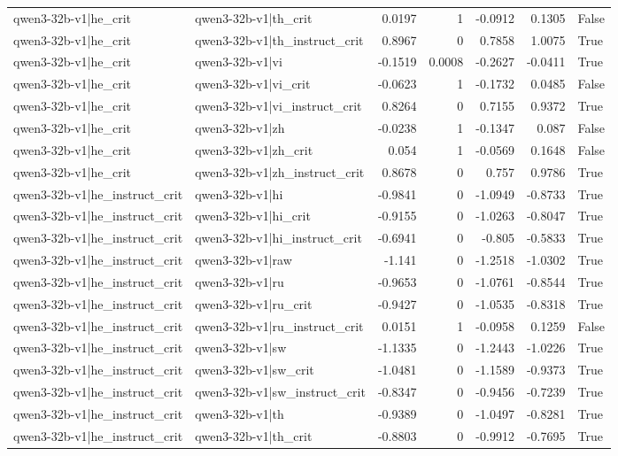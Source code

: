 \begin{table}
\begin{tabular}{l l r r r r l}
qwen3-32b-v1|he_crit & qwen3-32b-v1|th_crit & 0.0197 & 1 & -0.0912 & 0.1305 & False \\
qwen3-32b-v1|he_crit & qwen3-32b-v1|th_instruct_crit & 0.8967 & 0 & 0.7858 & 1.0075 & True \\
qwen3-32b-v1|he_crit & qwen3-32b-v1|vi & -0.1519 & 0.0008 & -0.2627 & -0.0411 & True \\
qwen3-32b-v1|he_crit & qwen3-32b-v1|vi_crit & -0.0623 & 1 & -0.1732 & 0.0485 & False \\
qwen3-32b-v1|he_crit & qwen3-32b-v1|vi_instruct_crit & 0.8264 & 0 & 0.7155 & 0.9372 & True \\
qwen3-32b-v1|he_crit & qwen3-32b-v1|zh & -0.0238 & 1 & -0.1347 & 0.087 & False \\
qwen3-32b-v1|he_crit & qwen3-32b-v1|zh_crit & 0.054 & 1 & -0.0569 & 0.1648 & False \\
qwen3-32b-v1|he_crit & qwen3-32b-v1|zh_instruct_crit & 0.8678 & 0 & 0.757 & 0.9786 & True \\
qwen3-32b-v1|he_instruct_crit & qwen3-32b-v1|hi & -0.9841 & 0 & -1.0949 & -0.8733 & True \\
qwen3-32b-v1|he_instruct_crit & qwen3-32b-v1|hi_crit & -0.9155 & 0 & -1.0263 & -0.8047 & True \\
qwen3-32b-v1|he_instruct_crit & qwen3-32b-v1|hi_instruct_crit & -0.6941 & 0 & -0.805 & -0.5833 & True \\
qwen3-32b-v1|he_instruct_crit & qwen3-32b-v1|raw & -1.141 & 0 & -1.2518 & -1.0302 & True \\
qwen3-32b-v1|he_instruct_crit & qwen3-32b-v1|ru & -0.9653 & 0 & -1.0761 & -0.8544 & True \\
qwen3-32b-v1|he_instruct_crit & qwen3-32b-v1|ru_crit & -0.9427 & 0 & -1.0535 & -0.8318 & True \\
qwen3-32b-v1|he_instruct_crit & qwen3-32b-v1|ru_instruct_crit & 0.0151 & 1 & -0.0958 & 0.1259 & False \\
qwen3-32b-v1|he_instruct_crit & qwen3-32b-v1|sw & -1.1335 & 0 & -1.2443 & -1.0226 & True \\
qwen3-32b-v1|he_instruct_crit & qwen3-32b-v1|sw_crit & -1.0481 & 0 & -1.1589 & -0.9373 & True \\
qwen3-32b-v1|he_instruct_crit & qwen3-32b-v1|sw_instruct_crit & -0.8347 & 0 & -0.9456 & -0.7239 & True \\
qwen3-32b-v1|he_instruct_crit & qwen3-32b-v1|th & -0.9389 & 0 & -1.0497 & -0.8281 & True \\
qwen3-32b-v1|he_instruct_crit & qwen3-32b-v1|th_crit & -0.8803 & 0 & -0.9912 & -0.7695 & True \\

\end{tabular}
\end{table}
